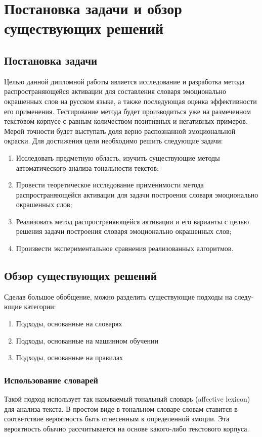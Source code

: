 \chapter{Постановка задачи и обзор существующих решений}
\section{Постановка задачи}
Целью данной дипломной работы является исследование и разработка метода
распространяющейся активации для составления словаря эмоционально окрашенных
слов на русском языке, а также последующая оценка эффективности его применения.
Тестирование метода будет производиться уже на размеченном текстовом корпусе
с равным количеством позитивных и негативных примеров. Мерой точности будет
выступать доля верно распознанной эмоциональной окраски. Для достижения цели
необходимо решить следующие задачи:
\begin{enumerate}
  \item Исследовать предметную область, изучить существующие методы
    автоматического анализа тональности текстов;
  \item Провести теоретическое исследование применимости метода
    распространяющейся активации для задачи построения словаря эмоционально
    окрашенных слов;
  \item Реализовать метод распространяющейся активации и его варианты с целью
    решения задачи построения словаря эмоционально окрашенных слов;
  \item Произвести экспериментальное сравнения реализованных алгоритмов.
\end{enumerate}

\section{Обзор существующих решений}
Сделав большое обобщение, можно разделить существующие подходы на следу-
ющие категории:

\begin{enumerate}
  \item Подходы, основанные на словарях
  \item Подходы, основанные на машинном обучении
  \item Подходы, основанные на правилах
\end{enumerate} 

\subsection{Использование словарей}
Такой подход использует так называемый тональный словарь (affective lexicon)
для анализа текста. В простом виде в тональном словаре словам ставится в
соответствие вероятность быть отнесенным к определенной эмоции. Эта
вероятность обычно рассчитывается на основе какого-либо текстового корпуса.

